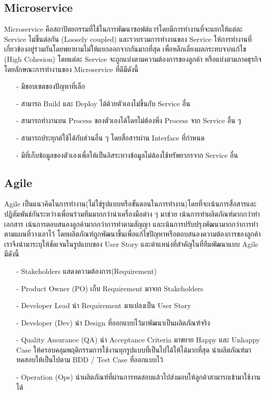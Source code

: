     \subsection{Microservice}
        Microservice คือสถาปัตยกรรมที่ใช้ในการพัฒนาซอฟต์แวร์โดยมีการทำงานที่จะแยกให้แต่ละ Service ไม่ขึ้นต่อกัน (Loosely coupled) และรวบรวมการทำงานของ Service ให้การทำงานที่เกี่ยวข้องอยู่ร่วมกันโดยพยายามไม่ให้แยกออกจากกันมากที่สุด
        เพื่อหลีกเลี่ยงผลกระทบจากแก้ไข (High Cohesion) โดยแต่ละ Service จะถูกแบ่งตามความต้องการของลูกค้า หรือแบ่งตามภาคธุรกิจ
        โดยลักษณะการทำงานของ Microservice ที่ดีมีดังนี้
        \begin{itemize}
            \item[-] มีขอบเขตของปัญหาที่เล็ก
            \item[-] สามารถ Build และ Deploy ได้ด้วยตัวเองไม่ขึ้นกับ Service อื่น
            \item[-] สามารถทำงานบน Process ของตัวเองได้โดยไม่ต้องพึ่ง Process จาก Service อื่น ๆ
            \item[-] สามารถประยุกต์ใช้ได้กับส่วนอื่น ๆ โดยสื่อสารผ่าน Interface ที่กำหนด
            \item[-] มีที่เก็บข้อมูลของตัวเองเพื่อให้เป็นอิสระทางข้อมูลไม่ต้องใช้ทรัพยากรจาก Service อื่น
        \end{itemize}

    \subsection{Agile}
        Agile เป็นแนวคิดในการทำงาน(ไม่ใช่รูปแบบหรือขั้นตอนในการทำงาน)โดยที่จะเน้นการสื่อสารและปฏิสัมพันธ์กันระหว่างเพื่อนร่วมทีมมากกว่านำเครื่องมือต่าง ๆ มาช่วย
        เน้นการทำผลิตภัณฑ์มากกว่าทำเอกสาร เน้นการตอบสนองลูกค้ามากกว่าการทำตามสัญญา และเน้นการปรับปรุงพัฒนามากกว่าการทำตามแผนที่วางเอาไว้
        โดยผลิตภัณฑ์ถูกพัฒนาขึ้นเพื่อแก้ไขปัญหาหรือตอบสนองความต้องการของลูกค้า เราจึงนำมาระบุให้ชัดเจนในรูปแบบของ User Story
        และตำแหน่งที่สำคัญในที่ทีมพัฒนาแบบ Agile มีดังนี้
        \begin{itemize}
            \item[-] Stakeholders แสดงความต้องการ(Requirement)
            \item[-] Product Owner (PO) เก็บ Requirement มาจาก Stakeholders
            \item[-] Developer Lead นำ Requirement มาแปลงเป็น User Story
            \item[-] Developer (Dev) นำ Design ที่ออกแบบไว้มาพัฒนาเป็นผลิตภัณฑ์จริง
            \item[-] Quality Assurance (QA) นำ Acceptance Criteria มาขยาย Happy และ Unhappy Case ให้ครอบคลุมพฤติกรรมการใช้งานทุกรูปแบบที่เป็นไปได้ให้ได้มากที่สุด นำผลิตภัณฑ์มาทดสอบให้เป็นไปตาม BDD / Test Case ที่ออกแบบไว้
            \item[-] Operation (Ops) นำผลิตภัณฑ์ที่ผ่านการทดสอบแล้วไปส่งมอบให้ลูกค้าสามารถเข้ามาใช้งานได้
        \end{itemize}

